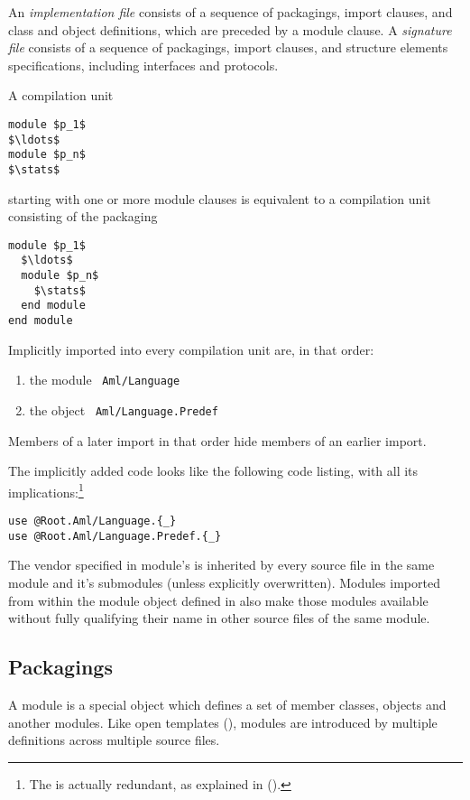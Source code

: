 An {\em implementation file} consists of a sequence of packagings, import clauses, and class and object definitions, which are preceded by a module clause. A {\em signature file} consists of a sequence of packagings, import clauses, and structure elements specifications, including interfaces and protocols. 

A compilation unit 
\begin{lstlisting}
module $p_1$
$\ldots$
module $p_n$
$\stats$
\end{lstlisting}
starting with one or more module clauses is equivalent to a compilation unit consisting of the packaging
\begin{lstlisting}
module $p_1$
  $\ldots$
  module $p_n$
    $\stats$
  end module
end module
\end{lstlisting}

Implicitly imported into every compilation unit are, in that order: 
\begin{enumerate}
\item the module ~\lstinline!Aml/Language! 
\item the object ~\lstinline!Aml/Language.Predef!
\end{enumerate} 
Members of a later import in that order hide members of an earlier import. 


The implicitly added code looks like the following code listing, with all its implications:\footnote{The  is actually redundant, as explained in ().}
\begin{lstlisting}
use @Root.Aml/Language.{_}
use @Root.Aml/Language.Predef.{_}
\end{lstlisting}

The vendor specified in module's  is inherited by every source file in the same module and it's submodules (unless explicitly overwritten). Modules imported from within the module object defined in  also make those modules available without fully qualifying their name in other source files of the same module. 





\subsection{Packagings}

A module is a special object which defines a set of member classes, objects and another modules. Like open templates (), modules are introduced by multiple definitions across multiple source files.  

